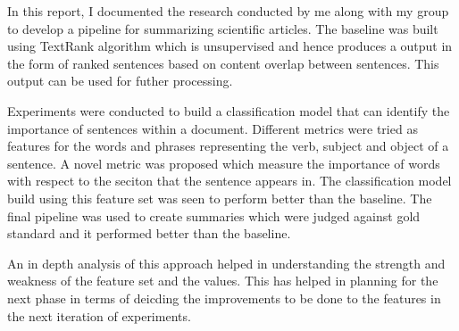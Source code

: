 In this report, I documented the research conducted by me along with my group to develop a pipeline for summarizing scientific articles.
The baseline was built using TextRank algorithm which is unsupervised and hence produces a output in the form of ranked sentences based on content overlap between sentences.
This output can be used for futher processing.

Experiments were conducted to build a classification model that can identify the importance of sentences within a document.
Different metrics were tried as features for the words and phrases representing the verb, subject and object of a sentence.
A novel metric was proposed which measure the importance of words with respect to the seciton that the sentence appears in.
The classification model build using this feature set was seen to perform better than the baseline.
The final pipeline was used to create summaries which were judged against gold standard and it performed better than the baseline.

An in depth analysis of this approach helped in understanding the strength and weakness of the feature set and the values.
This has helped in planning for the next phase in terms of deicding the improvements to be done to the features in the next iteration of experiments.